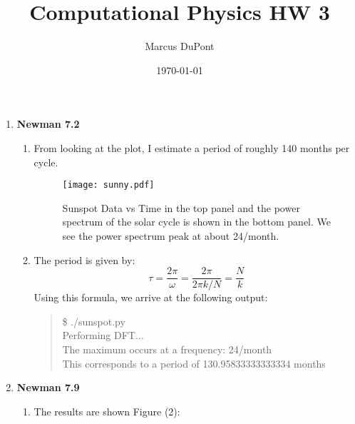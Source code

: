 \documentclass{article}
\title{Computational Physics HW 3}
\author{Marcus DuPont}
\date{\today}
\begin{document}
\maketitle

\begin{enumerate}
    \item {\textbf{Newman 7.2}
    \begin{enumerate}
        \item{From looking at the plot, I estimate a period of roughly 140 months per cycle.
        \begin{figure}[htp]
            \centering
            \texttt{[image: sunny.pdf]}
            \caption{Sunspot Data vs Time in the top panel and the power spectrum of the solar cycle is shown in the bottom panel. We see the power spectrum peak at about 24/month.}
            \label{fig:my_label}
        \end{figure}
        }
        \item{The period is given by:
        \begin{equation*}
            \tau = \frac{2\pi}{\omega} = \frac{2\pi}{2\pi k/N} = \frac{N}{k}
        \end{equation*}
        Using this formula, we arrive at the following output:
        \begin{quote}
            \$ ./sunspot.py \\
            Performing DFT...\\
            The maximum occurs at a frequency: 24/month\\

            This corresponds to a period of 130.95833333333334 months
        \end{quote}}
    \end{enumerate}
    }
    \item {\textbf{Newman 7.9}
    \begin{enumerate}
        \item{The results are shown Figure (2):
        
}
\end{enumerate}}
\end{enumerate}
\end{document}
